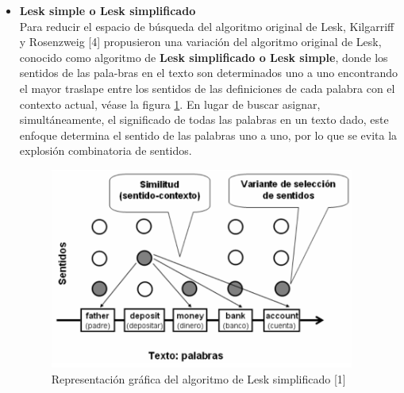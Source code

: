 \begin{itemize}
  \item \textbf{Lesk simple o Lesk simplificado} \\
    Para reducir el espacio de búsqueda del algoritmo original de Lesk, Kilgarriff y Rosenzweig [4] propusieron una variación del algoritmo original de Lesk, conocido como algoritmo de \textbf{Lesk simplificado o Lesk simple}, donde los sentidos de las pala-bras en el texto son determinados uno a uno encontrando el mayor traslape entre los sentidos de las definiciones de cada palabra con el contexto actual, véase la figura \ref{fig:lesk_simple}. En lugar de buscar asignar, simultáneamente, el significado de todas las palabras en un texto dado, este enfoque determina el sentido de las palabras uno a uno, por lo que se evita la explosión combinatoria de sentidos.
  
    \begin{figure}[h!]
      \begin{center}
      \includegraphics[angle=0, width=10cm]{Graficos/lesk_simple}
      \caption{Representación gráfica del algoritmo de Lesk simplificado [1]}
      \label{fig:lesk_simple}
      \end{center}
    \end{figure}
    

\end{itemize}
